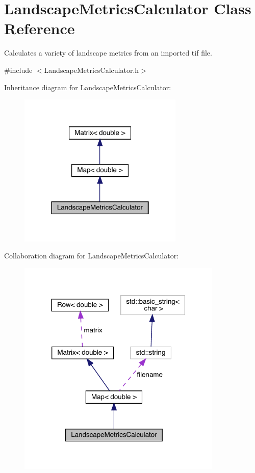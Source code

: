 \hypertarget{class_landscape_metrics_calculator}{}\section{Landscape\+Metrics\+Calculator Class Reference}
\label{class_landscape_metrics_calculator}


Calculates a variety of landscape metrics from an imported tif file.  




{\ttfamily \#include $<$Landscape\+Metrics\+Calculator.\+h$>$}



Inheritance diagram for Landscape\+Metrics\+Calculator\+:
\nopagebreak
\begin{figure}[H]
\begin{center}
\leavevmode
\includegraphics[width=222pt]{class_landscape_metrics_calculator__inherit__graph}
\end{center}
\end{figure}


Collaboration diagram for Landscape\+Metrics\+Calculator\+:
\nopagebreak
\begin{figure}[H]
\begin{center}
\leavevmode
\includegraphics[width=276pt]{class_landscape_metrics_calculator__coll__graph}
\end{center}
\end{figure}
